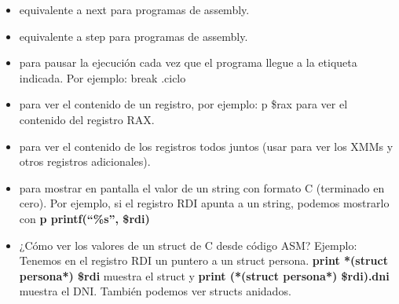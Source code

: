 
\begin{itemize}
	\item {} equivalente a next para programas de assembly.
	\item {} equivalente a step para programas de assembly.
	\item {} para pausar la ejecución cada vez que el programa llegue a la etiqueta indicada. Por ejemplo: break .ciclo
	\item {} para ver el contenido de un registro, por ejemplo: p \$rax para ver el contenido del registro RAX.
	\item {} para ver el contenido de los registros todos juntos (usar  para ver los XMMs y otros registros adicionales).
	\item {} para mostrar en pantalla el valor de un string con formato C (terminado en cero). Por ejemplo, si el registro RDI apunta a un string, podemos mostrarlo con \textbf{p printf(“\%s”, \$rdi)}
	\item ¿Cómo ver los valores de un struct de C desde código ASM? Ejemplo: Tenemos en el registro RDI un puntero a un struct persona. \textbf{print *(struct persona*) \$rdi} muestra el struct y \textbf{print (*(struct persona*) \$rdi).dni} muestra el DNI. También podemos ver structs anidados.

\end{itemize}
